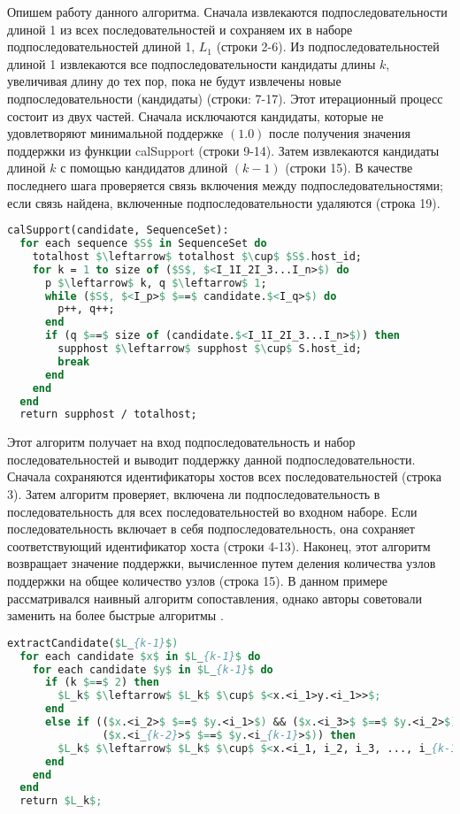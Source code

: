 Опишем работу данного алгоритма.
Сначала извлекаются подпоследовательности длиной 1 из всех последовательностей и сохраняем их в наборе подпоследовательностей длиной 1, $L_1$ (строки 2-6).
Из подпоследовательностей длиной 1 извлекаются все подпоследовательности кандидаты длины $k$,
увеличивая длину до тех пор, пока не будут извлечены новые подпоследовательности (кандидаты) (строки: 7-17).
Этот итерационный процесс состоит из двух частей.
Сначала исключаются кандидаты, которые не удовлетворяют минимальной поддержке $(1.0)$ после получения значения поддержки из функции calSupport (строки 9-14).
Затем извлекаются кандидаты длиной $k$ с помощью кандидатов длиной $(k-1)$ (строки 15).
В качестве последнего шага проверяется связь включения между подпоследовательностями; если связь найдена, включенные подпоследовательности удаляются (строка 19).

\begin{lstlisting}[language=Pascal, caption=Алгоритм вычисления поддержки, mathescape]
calSupport(candidate, SequenceSet):
  for each sequence $S$ in SequenceSet do
    totalhost $\leftarrow$ totalhost $\cup$ $S$.host_id;
    for k = 1 to size of ($S$, $<I_1I_2I_3...I_n>$) do
      p $\leftarrow$ k, q $\leftarrow$ 1;
      while ($S$, $<I_p>$ $==$ candidate.$<I_q>$) do
        p++, q++;
      end
      if (q $==$ size of (candidate.$<I_1I_2I_3...I_n>$)) then
        supphost $\leftarrow$ supphost $\cup$ S.host_id;
        break
      end
    end
  end
  return supphost / totalhost;
\end{lstlisting}

Этот алгоритм получает на вход подпоследовательность и набор последовательностей и выводит поддержку данной подпоследовательности.
Сначала сохраняются идентификаторы хостов всех последовательностей (строка 3).
Затем алгоритм проверяет, включена ли подпоследовательность в последовательность для всех последовательностей во входном наборе.
Если последовательность включает в себя подпоследовательность, она сохраняет соответствующий идентификатор хоста (строки 4-13).
Наконец, этот алгоритм возвращает значение поддержки, вычисленное путем деления количества узлов поддержки на общее количество узлов (строка 15).
В данном примере рассматривался наивный алгоритм сопоставления, однако авторы советовали заменить на более быстрые алгоритмы
\cite{karp1987efficient,boyer1977fast,xie2010improved,zhou2019research}.

\begin{lstlisting}[language=Pascal, caption=Алгоритм извлечения кандидата, mathescape]
extractCandidate($L_{k-1}$)
  for each candidate $x$ in $L_{k-1}$ do
    for each candidate $y$ in $L_{k-1}$ do
      if (k $==$ 2) then
        $L_k$ $\leftarrow$ $L_k$ $\cup$ $<x.<i_1>y.<i_1>>$;
      end
      else if (($x.<i_2>$ $==$ $y.<i_1>$) && ($x.<i_3>$ $==$ $y.<i_2>$) && ...
               ($x.<i_{k-2}>$ $==$ $y.<i_{k-1}>$)) then
        $L_k$ $\leftarrow$ $L_k$ $\cup$ $<x.<i_1, i_2, i_3, ..., i_{k-1}>y.<i_{k-1}>$;
      end
    end
  end
  return $L_k$;
\end{lstlisting}

